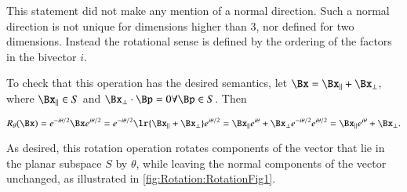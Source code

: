 This statement did not make any mention of a normal direction.
Such a normal direction is not unique for dimensions higher than 3, nor defined for two dimensions.
Instead the rotational sense is defined by the ordering of the factors in the bivector \( i \).

To check that this operation has the desired semantics,
let \( \Bx = \Bx_\parallel + \Bx_\perp \), where \( \Bx_\parallel \in S \) and \( \Bx_\perp \cdot \Bp = 0 \forall \Bp \in S \).  Then

\begin{dmath}\label{eqn:generalRotation:1880}
R_\theta(\Bx)
=
e^{ - i \theta/2 } \Bx e^{ i\theta/2 }
=
e^{ - i \theta/2 } \lr{ \Bx_\parallel + \Bx_\perp } e^{ i\theta/2 }
=
\Bx_\parallel e^{ i\theta } +
\Bx_\perp e^{ - i \theta/2 } e^{ i\theta/2 }
=
\Bx_\parallel e^{ i\theta } + \Bx_\perp.
\end{dmath}

As desired, this rotation operation
rotates components of the vector that lie in the planar subspace \( S \) by \( \theta \), while leaving the normal components of the vector unchanged, as illustrated in \cref{fig:Rotation:RotationFig1}.

